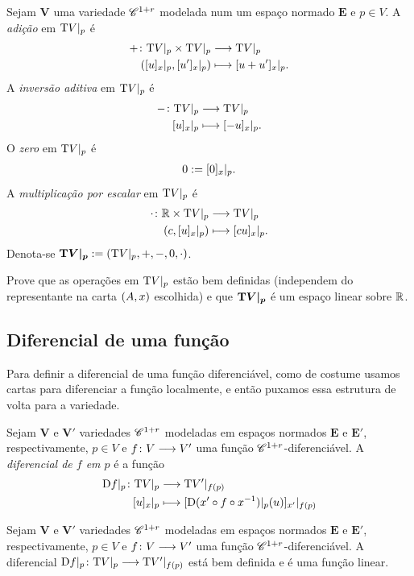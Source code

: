 \begin{definition}
Sejam $\bm V$ uma variedade $\mathscr{C}^{1+r}$ modelada num um espaço normado $\bm E$ e $p \in V$. A \emph{adição} em $\mathrm{T} V|_p$ é
	\begin{align*}
	{+}\colon {\mathrm{T}V|_p \times \mathrm{T}V|_p} &\longrightarrow {\mathrm{T}V|_p} \\{([u]_{x}|_p, [u']_{x}|_p)} &\longmapsto [u+u']_{x}|_p.
	\end{align*}
A \emph{inversão aditiva} em $\mathrm{T} V|_p$ é
	\begin{align*}
	{-}\colon {\mathrm{T}V|_p} &\longrightarrow {\mathrm{T}V|_p} \\{[u]_{x}|_p} &\longmapsto [-u]_{x}|_p.
	\end{align*}
O \emph{zero} em $\mathrm{T} V|_p$ é
	\begin{align*}
	0 := [0]_{x}|_p.
	\end{align*}
A \emph{multiplicação por escalar} em $\mathrm{T} V|_p$ é
	\begin{align*}
	{\cdot}\colon {\mathbb{R}\times \mathrm{T}V|_p} &\longrightarrow {\mathrm{T}V|_p} \\{(c, [u]_{x}|_p)} &\longmapsto [cu]_{x}|_p.
	\end{align*}
Denota-se $\bm {\mathrm{T} V|_p} := (\mathrm{T} V|_p,+,-,0,\cdot)$. 
\end{definition}

\begin{exercise}
Prove que as operações em $\mathrm{T} V|_p$ estão bem definidas (independem do representante na carta $(A,x)$ escolhida) e que $\bm {\mathrm{T} V|_p}$ é um espaço linear sobre $\mathbb{R}$.
\end{exercise}


\subsection{Diferencial de uma função}

Para definir a diferencial de uma função diferenciável, como de costume usamos cartas para diferenciar a função localmente, e então puxamos essa estrutura de volta para a variedade.

\begin{definition}
Sejam $\bm V$ e $\bm V'$ variedades $\mathscr{C}^{1+r}$ modeladas em espaços normados $\bm E$ e $\bm E'$, respectivamente, $p \in V$ e $f\colon \allowbreak V \longrightarrow V'$ uma função $\mathscr{C}^{1+r}$-diferenciável. A \emph{diferencial de $f$ em $p$} é a função
	\begin{align*}
		{\mathrm{D}f|_p}\colon {\mathrm{T}V|_p} &\longrightarrow {\mathrm{T}V'|_{f(p)}} \\{[u]_{x}|_p} &\longmapsto [\mathrm{D}(x' \circ f \circ x^{-1})|_p(u)]_{x'}|_{f(p)}
	\end{align*}
\end{definition}


\begin{proposition}
Sejam $\bm V$ e $\bm V'$ variedades $\mathscr{C}^{1+r}$ modeladas em espaços normados $\bm E$ e $\bm E'$, respectivamente, $p \in V$ e $f\colon \allowbreak V \longrightarrow V'$ uma função $\mathscr{C}^{1+r}$-diferenciável. A diferencial $\mathrm{D} f|_p\colon \allowbreak \mathrm{T} V|_p \longrightarrow \mathrm{T} V'|_{f(p)}$ está bem definida e é uma função linear.
\end{proposition}

